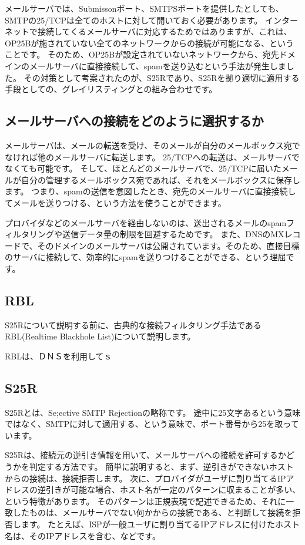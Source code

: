メールサーバでは、Submissonポート、SMTPSポートを提供したとしても、SMTPの25/TCPは全てのホストに対して開いておく必要があります。
インターネットで接続してくるメールサーバに対応するためではありますが、これは、OP25Bが施されていない全てのネットワークからの接続が可能になる、ということです。
そのため、OP25Bが設定されていないネットワークから、宛先ドメインのメールサーバに直接接続して、spamを送り込むという手法が発生しました。
その対策として考案されたのが、S25Rであり、S25Rを拠り適切に適用する手段としての、グレイリスティングとの組み合わせです。

\subsection{メールサーバへの接続をどのように選択するか}

メールサーバは、メールの転送を受け、そのメールが自分のメールボックス宛でなければ他のメールサーバに転送します。
25/TCPへの転送は、メールサーバでなくても可能です。
そして、ほとんどのメールサーバで、25/TCPに届いたメールが自分の管理するメールボックス宛であれば、それをメールボックスに保存します。
つまり、spamの送信を意図したとき、宛先のメールサーバに直接接続してメールを送りつける、という方法を使うことができます。

プロバイダなどのメールサーバを経由しないのは、送出されるメールのspamフィルタリングや送信データ量の制限を回避するためです。
また、DNSのMXレコードで、そのドメインのメールサーバは公開されています。そのため、直接目標のサーバに接続して、効率的にspamを送りつけることができる、という理屈です。

\subsection{RBL}

S25Rについて説明する前に、古典的な接続フィルタリング手法であるRBL(Realtime Blackhole List)について説明します。

RBLは、ＤＮＳを利用してｓ


\subsection{S25R}

S25Rとは、Se;ective SMTP Rejectionの略称です。
途中に25文字あるという意味ではなく、SMTPに対して適用する、という意味で、ポート番号から25を取っています。

S25Rは、接続元の逆引き情報を用いて、メールサーバへの接続を許可するかどうかを判定する方法です。
簡単に説明すると、まず、逆引きができないホストからの接続は、接続拒否します。
次に、プロバイダがユーザに割り当てるIPアドレスの逆引きが可能な場合、ホスト名が一定のパターンに収まることが多い、という特徴があります。
そのパターンは正規表現で記述できるため、それに一致したものは、メールサーバでない何かからの接続である、と判断して接続を拒否します。
たとえば、ISPが一般ユーザに割り当てるIPアドレスに付けたホスト名は、そのIPアドレスを含む、などです。

